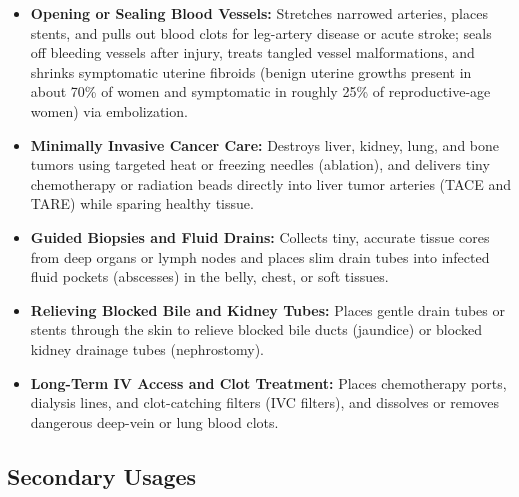 \begin{itemize}
    \item \textbf{Opening or Sealing Blood Vessels:} Stretches narrowed arteries, places stents, and pulls out blood clots for leg-artery disease or acute stroke; seals off bleeding vessels after injury, treats tangled vessel malformations, and shrinks symptomatic uterine fibroids (benign uterine growths present in about 70\% of women and symptomatic in roughly 25\% of reproductive-age women) via embolization.
    \item \textbf{Minimally Invasive Cancer Care:} Destroys liver, kidney, lung, and bone tumors using targeted heat or freezing needles (ablation), and delivers tiny chemotherapy or radiation beads directly into liver tumor arteries (TACE and TARE) while sparing healthy tissue.
    \item \textbf{Guided Biopsies and Fluid Drains:} Collects tiny, accurate tissue cores from deep organs or lymph nodes and places slim drain tubes into infected fluid pockets (abscesses) in the belly, chest, or soft tissues.
    \item \textbf{Relieving Blocked Bile and Kidney Tubes:} Places gentle drain tubes or stents through the skin to relieve blocked bile ducts (jaundice) or blocked kidney drainage tubes (nephrostomy).
    \item \textbf{Long-Term IV Access and Clot Treatment:} Places chemotherapy ports, dialysis lines, and clot-catching filters (IVC filters), and dissolves or removes dangerous deep-vein or lung blood clots.
\end{itemize}

\subsection{Secondary Usages}

